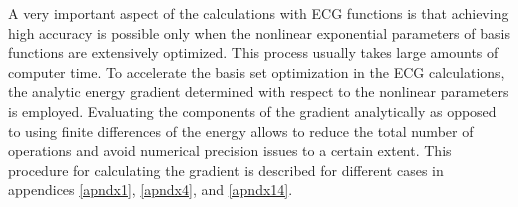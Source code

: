 A very important aspect of the calculations with ECG functions is that achieving 
high accuracy is possible only when the nonlinear exponential parameters of basis 
functions are extensively optimized. This process usually takes large amounts of 
computer time. To accelerate the basis set optimization in the ECG calculations, 
the analytic energy gradient determined with respect to the nonlinear parameters 
is employed. 
Evaluating the components of the gradient analytically as opposed to using finite 
differences of the energy allows to reduce the total number of operations
and avoid numerical precision issues to a certain extent.
This procedure for calculating the gradient is described for different cases 
in appendices \ref{apndx1}, \ref{apndx4}, and \ref{apndx14}.


